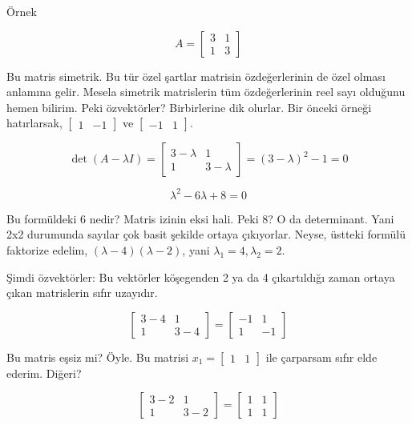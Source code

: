 \documentclass[12pt,fleqn]{article}\usepackage{../../common}
\begin{document}
Örnek

$$ 
A = \left[\begin{array}{ccc}
3 & 1 \\ 1 & 3
\end{array}\right]
$$

Bu matris simetrik. Bu tür özel şartlar matrisin özdeğerlerinin de özel olması
anlamına gelir. Mesela simetrik matrislerin tüm özdeğerlerinin reel sayı
olduğunu hemen bilirim. Peki özvektörler? Birbirlerine dik olurlar. Bir önceki
örneği hatırlarsak, $\left[\begin{array}{cc}1&-1\end{array}\right]$ ve
$\left[\begin{array}{cc}-1&1\end{array}\right]$.

$$
\det (A -\lambda I) = \left[\begin{array}{ccc} 3-\lambda & 1 \\ 1 & 3-\lambda
\end{array}\right] = 
(3-\lambda)^2 -1 = 0
$$

$$ \lambda^2 - 6\lambda + 8 = 0 $$

Bu formüldeki $6$ nedir? Matris izinin eksi hali. Peki 8? O da
determinant. Yani 2x2 durumunda sayılar çok basit şekilde ortaya
çıkıyorlar. Neyse, üstteki formülü faktorize edelim, $(\lambda - 4)(\lambda
- 2)$, yani $\lambda_1 = 4,\lambda_2 = 2$. 

Şimdi özvektörler: Bu vektörler köşegenden 2 ya da 4 çıkartıldığı zaman
ortaya çıkan matrislerin sıfır uzayıdır. 

$$ 
\left[\begin{array}{ccc}
3-4 & 1 \\ 1 & 3-4
\end{array}\right] = 
\left[\begin{array}{ccc}
-1 & 1 \\ 1 & -1
\end{array}\right]
$$

Bu matris eşsiz mi? Öyle. Bu matrisi
$x_1=\left[\begin{array}{cc} 1 & 1 \end{array}\right]$ ile çarparsam sıfır
elde ederim. Diğeri?

$$ 
\left[\begin{array}{ccc}
3-2 & 1 \\ 1 & 3-2
\end{array}\right] = 
\left[\begin{array}{ccc}
1 & 1 \\ 1 & 1
\end{array}\right]
 $$
\end{document}
